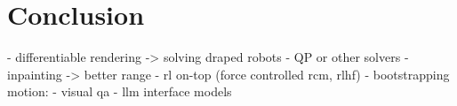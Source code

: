 \chapter[Conclusion]{Conclusion}
\label{chap:conclusion}

- differentiable rendering -> solving draped robots
- QP or other solvers
- inpainting -> better range
- rl on-top (force controlled rcm, rlhf)
- bootstrapping motion:
    - visual qa
- llm interface models

